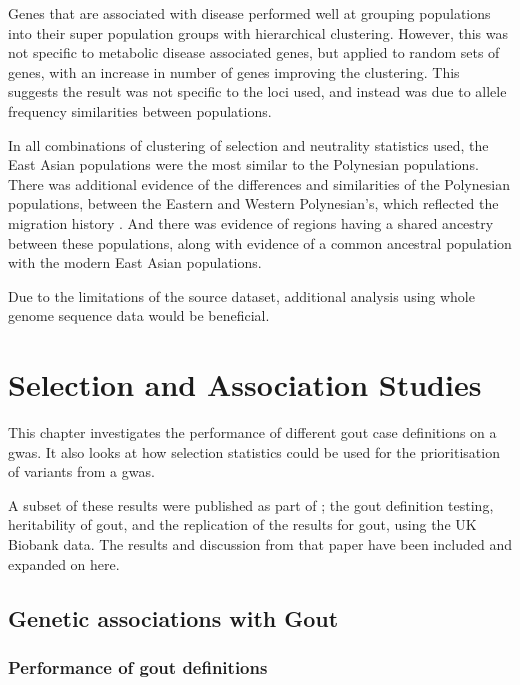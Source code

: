\documentclass[twoside,openright]{report}
\begin{document}
Genes that are associated with disease performed well at grouping
populations into their super population groups with hierarchical
clustering. However, this was not specific to metabolic disease
associated genes, but applied to random sets of genes, with an increase
in number of genes improving the clustering. This suggests the result
was not specific to the loci used, and instead was due to allele
frequency similarities between populations.

In all combinations of clustering of selection and neutrality statistics
used, the East Asian populations were the most similar to the Polynesian
populations. There was additional evidence of the differences and
similarities of the Polynesian populations, between the Eastern and
Western Polynesian's, which reflected the migration history . And there
was evidence of regions having a shared ancestry between these
populations, along with evidence of a common ancestral population with
the modern East Asian populations.

Due to the limitations of the source dataset, additional analysis using
whole genome sequence data would be beneficial.

\chapter{Selection and Association Studies}\label{selGwas}

\glsresetall

This chapter investigates the performance of different gout case
definitions on a \gls{gwas}. It also looks at how selection statistics
could be used for the prioritisation of variants from a \gls{gwas}.

A subset of these results were published as part of \citet{Cadzow2017};
the gout definition testing, heritability of gout, and the replication
of the \citet{Kottgen2013} results for gout, using the UK Biobank data.
The results and discussion from that paper have been included and
expanded on here.

\section{Genetic associations with
Gout}\label{genetic-associations-with-gout}

\subsection{Performance of gout
definitions}\label{performance-of-gout-definitions}
\end{document}
